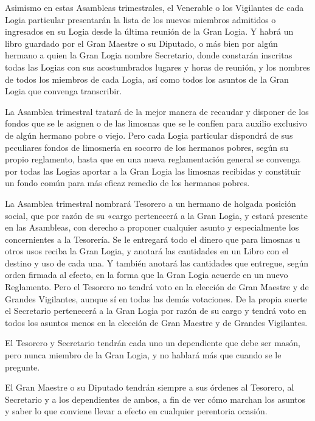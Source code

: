 \documentclass[a4paper,12pt,twoside]{book}
\begin{document}
\noindent Asimismo en estas Asambleas trimestrales, el Venerable o los Vigilantes de cada Logia particular presentarán la lista de los nuevos miembros admitidos o ingresados en su Logia desde la última reunión de la Gran Logia. Y habrá un libro guardado por el Gran Maestre o su Diputado, o más bien por algún hermano a quien la Gran Logia nombre Secretario, donde constarán inscritas todas las Logias con sus acostumbrados lugares y horas de reunión, y los nombres de todos los miembros de cada Logia, así como todos los asuntos de la Gran Logia que convenga transcribir.

\noindent La Asamblea trimestral tratará de la mejor manera de recaudar y disponer de los fondos que se le asignen o de las limosnas que se le confíen para auxilio exclusivo de algún hermano pobre o viejo. Pero cada Logia particular dispondrá de sus peculiares fondos de limosnería en socorro de los hermanos pobres, según su propio reglamento, hasta que en una nueva reglamentación general se convenga por todas las Logias aportar a la Gran Logia las limosnas recibidas y constituir un fondo común para más eficaz remedio de los hermanos pobres.

\noindent La Asamblea trimestral nombrará Tesorero a un hermano de holgada posición social, que por razón de su «cargo pertenecerá a la Gran Logia, y estará presente en las Asambleas, con derecho a proponer cualquier asunto y especialmente los concernientes a la Tesorería. Se le entregará todo el dinero que para limosnas u otros usos reciba la Gran Logia, y anotará las cantidades en un Libro con el destino y uso de cada una. Y también anotará las cantidades que entregue, según orden firmada al efecto, en la forma que la Gran Logia acuerde en un nuevo Reglamento. Pero el Tesorero no tendrá voto en la elección de Gran Maestre y de Grandes Vigilantes, aunque sí en todas las demás votaciones. De la propia suerte el Secretario pertenecerá a la Gran Logia por razón de su cargo y tendrá voto en todos los asuntos menos en la elección de Gran Maestre y de Grandes Vigilantes.

\noindent El Tesorero y Secretario tendrán cada uno un dependiente que debe ser masón, pero nunca miembro de la Gran Logia, y no hablará más que cuando se le pregunte.

\noindent El Gran Maestre o su Diputado tendrán siempre a sus órdenes al Tesorero, al Secretario y a los dependientes de ambos, a fin de ver cómo marchan los asuntos y saber lo que conviene llevar a efecto en cualquier perentoria ocasión.
\end{document}

